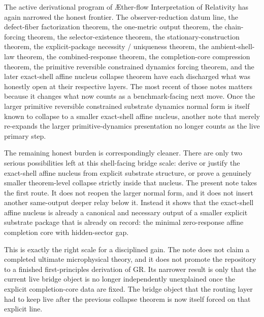 \documentclass[11pt]{article}
\newcommand{\Aflow}{\AE{}ther-flow}
\newcommand{\TheoryName}{\Aflow{} Interpretation of Relativity}
\begin{document}
The active derivational program of \TheoryName{} has again narrowed the honest frontier. The observer-reduction datum line, the defect-fiber factorization theorem, the one-metric output theorem, the chain-forcing theorem, the selector-existence theorem, the stationary-construction theorem, the explicit-package necessity / uniqueness theorem, the ambient-shell-law theorem, the combined-response theorem, the completion-core compression theorem, the primitive reversible constrained dynamics forcing theorem, and the later exact-shell affine nucleus collapse theorem have each discharged what was honestly open at their respective layers. The most recent of those notes matters because it changes what now counts as a benchmark-facing next move. Once the larger primitive reversible constrained substrate dynamics normal form is itself known to collapse to a smaller exact-shell affine nucleus, another note that merely re-expands the larger primitive-dynamics presentation no longer counts as the live primary step.

The remaining honest burden is correspondingly cleaner. There are only two serious possibilities left at this shell-facing bridge scale: derive or justify the exact-shell affine nucleus from explicit substrate structure, or prove a genuinely smaller theorem-level collapse strictly inside that nucleus. The present note takes the first route. It does not reopen the larger normal form, and it does not insert another same-output deeper relay below it. Instead it shows that the exact-shell affine nucleus is already a canonical and necessary output of a smaller explicit substrate package that is already on record: the minimal zero-response affine completion core with hidden-sector gap.

This is exactly the right scale for a disciplined gain. The note does not claim a completed ultimate microphysical theory, and it does not promote the repository to a finished first-principles derivation of GR. Its narrower result is only that the current live bridge object is no longer independently unexplained once the explicit completion-core data are fixed. The bridge object that the routing layer had to keep live after the previous collapse theorem is now itself forced on that explicit line.
\end{document}
